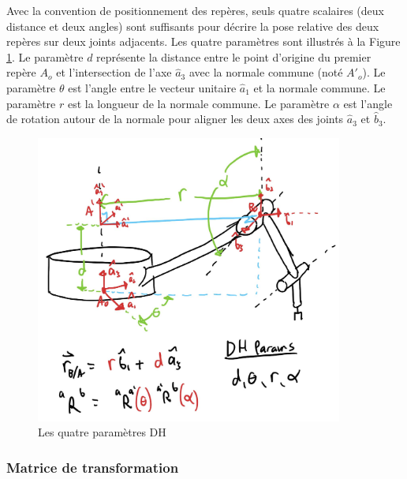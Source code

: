 Avec la convention de positionnement des repères, seuls quatre scalaires (deux distance et deux angles) sont suffisants pour décrire la pose relative des deux repères sur deux joints adjacents. Les quatre paramètres sont illustrés à la Figure \ref{fig:dh2}. Le paramètre $d$ représente la distance entre le point d'origine du premier repère $A_o$ et l'intersection de l'axe $\hat{a}_3$ avec la normale commune (noté $A'_o$).  Le paramètre $\theta$ est l'angle entre le vecteur unitaire $\hat{a}_1$ et la normale commune. Le paramètre $r$ est la longueur de la normale commune. Le paramètre $\alpha$ est l'angle de rotation autour de la normale pour aligner les deux axes des joints $\hat{a}_3$ et $\hat{b}_3$.
\begin{figure}[H]
	\centering
		\includegraphics[width=0.90\textwidth]{fig/dh2.jpg}
	\caption{Les quatre paramètres DH}
	\label{fig:dh2}
\end{figure}

\subsubsection{Matrice de transformation}

